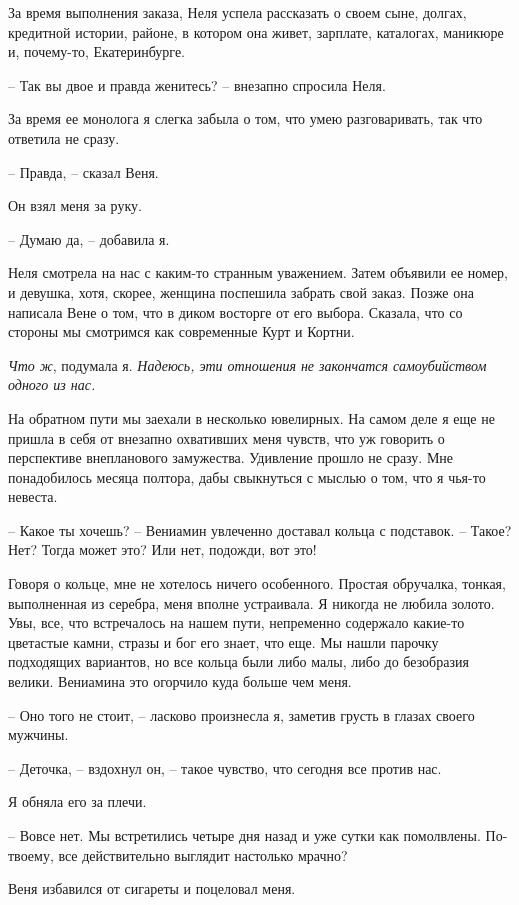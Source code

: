 \documentclass[
]{book}
\begin{document}
За время выполнения заказа, Неля успела рассказать о своем сыне, долгах, кредитной истории, районе, в котором она живет, зарплате, каталогах, маникюре и, почему-то, Екатеринбурге.

-- Так вы двое и правда женитесь? -- внезапно спросила Неля.

За время ее монолога я слегка забыла о том, что умею разговаривать, так что ответила не сразу.

-- Правда, -- сказал Веня.

Он взял меня за руку.

-- Думаю да, -- добавила я.

Неля смотрела на нас с каким-то странным уважением. Затем объявили ее номер, и девушка, хотя, скорее, женщина поспешила забрать свой заказ. Позже она написала Вене о том, что в диком восторге от его выбора. Сказала, что со стороны мы смотримся как современные Курт и Кортни.

\emph{Что ж}, подумала я. \emph{Надеюсь, эти отношения не закончатся самоубийством одного из нас.}

На обратном пути мы заехали в несколько ювелирных. На самом деле я еще не пришла в себя от внезапно охвативших меня чувств, что уж говорить о перспективе внепланового замужества. Удивление прошло не сразу. Мне понадобилось месяца полтора, дабы свыкнуться с мыслью о том, что я чья-то невеста.

-- Какое ты хочешь? -- Вениамин увлеченно доставал кольца с подставок. -- Такое? Нет? Тогда может это? Или нет, подожди, вот это!

Говоря о кольце, мне не хотелось ничего особенного. Простая обручалка, тонкая, выполненная из серебра, меня вполне устраивала. Я никогда не любила золото. Увы, все, что встречалось на нашем пути, непременно содержало какие-то цветастые камни, стразы и бог его знает, что еще. Мы нашли парочку подходящих вариантов, но все кольца были либо малы, либо до безобразия велики. Вениамина это огорчило куда больше чем меня.

-- Оно того не стоит, -- ласково произнесла я, заметив грусть в глазах своего мужчины.

-- Деточка, -- вздохнул он, -- такое чувство, что сегодня все против нас.

Я обняла его за плечи.

-- Вовсе нет. Мы встретились четыре дня назад и уже сутки как помолвлены. По-твоему, все действительно выглядит настолько мрачно?

Веня избавился от сигареты и поцеловал меня.
\end{document}
